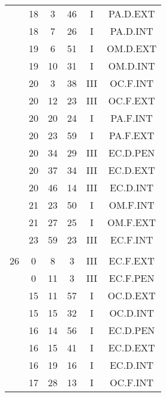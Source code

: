 \documentclass[12pt, a4paper]{article}
\begin{document}
\begin{multicols}{3}
{\begin{tabular}{c c c c c c}
	 	 	 	 & 18 & 3 & 46 & I & PA.D.EXT\\%
	 	 	 	 & 18 & 7 & 26 & I & PA.D.INT\\%
	 	 	 	 & 19 & 6 & 51 & I & OM.D.EXT\\%
	 	 	 	 & 19 & 10 & 31 & I & OM.D.INT\\%
	 	 	 	 & 20 & 3 & 38 & III & OC.F.INT\\%
	 	 	 	 & 20 & 12 & 23 & III & OC.F.EXT\\%
	 	 	 	 & 20 & 20 & 24 & I & PA.F.INT\\%
	 	 	 	 & 20 & 23 & 59 & I & PA.F.EXT\\%
	 	 	 	 & 20 & 34 & 29 & III & EC.D.PEN\\%
	 	 	 	 & 20 & 37 & 34 & III & EC.D.EXT\\%
	 	 	 	 & 20 & 46 & 14 & III & EC.D.INT\\%
	 	 	 	 & 21 & 23 & 50 & I & OM.F.INT\\%
	 	 	 	 & 21 & 27 & 25 & I & OM.F.EXT\\%
	 	 	 	 & 23 & 59 & 23 & III & EC.F.INT\\%
	 	 	 	 & & & & & \\%
	 	 	 	26 & 0 & 8 & 3 & III & EC.F.EXT\\%
	 	 	 	 & 0 & 11 & 3 & III & EC.F.PEN\\%
	 	 	 	 & 15 & 11 & 57 & I & OC.D.EXT\\%
	 	 	 	 & 15 & 15 & 32 & I & OC.D.INT\\%
	 	 	 	 & 16 & 14 & 56 & I & EC.D.PEN\\%
	 	 	 	 & 16 & 15 & 41 & I & EC.D.EXT\\%
	 	 	 	 & 16 & 19 & 16 & I & EC.D.INT\\%
	 	 	 	 & 17 & 28 & 13 & I & OC.F.INT\\%

\end{tabular}}
\end{multicols}
\end{document}
